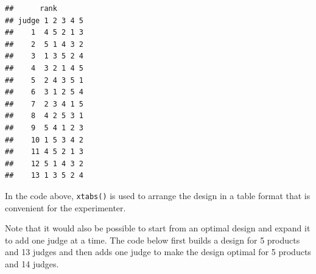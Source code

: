 \documentclass[
]{krantz}
\makeatletter
\newenvironment{Shaded}{\begin{snugshade}}{\end{snugshade}}
\newcommand{\AttributeTok}[1]{\textcolor[rgb]{0.61,0.61,0.61}{#1}}
\newcommand{\ConstantTok}[1]{\textcolor[rgb]{0,0,0}{#1}}
\newcommand{\DecValTok}[1]{\textcolor[rgb]{0.06,0.06,0.06}{#1}}
\newcommand{\FunctionTok}[1]{\textcolor[rgb]{0,0,0}{#1}}
\newcommand{\NormalTok}[1]{#1}
\newcommand{\OtherTok}[1]{\textcolor[rgb]{0.37,0.37,0.37}{#1}}
\newcommand{\SpecialCharTok}[1]{\textcolor[rgb]{0,0,0}{#1}}
\newenvironment{kframe}{%
\medskip{}
\setlength{\fboxsep}{.8em}
 \def\at@end@of@kframe{}%
 \ifinner\ifhmode%
  \def\at@end@of@kframe{\end{minipage}}%
  \begin{minipage}{\columnwidth}%
 \fi\fi%
 \def\FrameCommand##1{\hskip\@totalleftmargin \hskip-\fboxsep
 \colorbox{shadecolor}{##1}\hskip-\fboxsep
     \hskip-\linewidth \hskip-\@totalleftmargin \hskip\columnwidth}%
 \MakeFramed {\advance\hsize-\width
   \@totalleftmargin\z@ \linewidth\hsize
   \@setminipage}}%
 {\par\unskip\endMakeFramed%
 \at@end@of@kframe}
\renewenvironment{Shaded}{\begin{kframe}}{\end{kframe}}
\makeatother
\begin{document}
\begin{Shaded}
\end{Shaded}

\begin{verbatim}
##      rank
## judge 1 2 3 4 5
##    1  4 5 2 1 3
##    2  5 1 4 3 2
##    3  1 3 5 2 4
##    4  3 2 1 4 5
##    5  2 4 3 5 1
##    6  3 1 2 5 4
##    7  2 3 4 1 5
##    8  4 2 5 3 1
##    9  5 4 1 2 3
##    10 1 5 3 4 2
##    11 4 5 2 1 3
##    12 5 1 4 3 2
##    13 1 3 5 2 4
\end{verbatim}

In the code above, \texttt{xtabs()} is used to arrange the design in a table format that is convenient for the experimenter.

Note that it would also be possible to start from an optimal design and expand it to add one judge at a time. The code below first builds a design for 5 products and 13 judges and then adds one judge to make the design optimal for 5 products and 14 judges.
\end{document}
